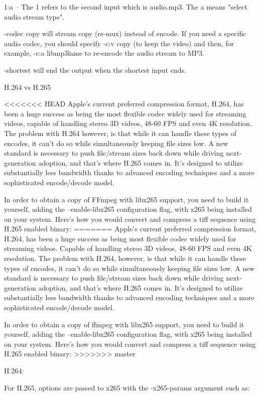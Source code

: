 \begin{fullwidth}
1:a – The 1 refers to the second input which is audio.mp3. The a means "select audio stream type".

-codec copy will stream copy (re-mux) instead of encode. If you need a specific audio codec, you should specify -c:v copy (to keep the video) and then, for example, -c:a libmp3lame to re-encode the audio stream to MP3.

-shortest will end the output when the shortest input ends.

{\large H.264 vs H.265 \par}

<<<<<<< HEAD
Apple’s current preferred compression format, H.264, has been a huge success as being the most flexible codec widely used for streaming videos, capable of handling stereo 3D videos, 48-60 FPS and even 4K resolution. The problem with H.264 however, is that while it can handle these types of encodes, it can’t do so while simultaneously keeping file sizes low. A new standard is necessary to push file/stream sizes back down while driving next-generation adoption, and that’s where H.265 comes in. It’s designed to utilize substantially less bandwidth thanks to advanced encoding techniques and a more sophisticated encode/decode model.

In order to obtain a copy of FFmpeg with libx265 support, you need to build it yourself, adding the --enable-libx265 configuration flag, with x265 being installed on your system. Here’s how you would convert and compress a tiff sequence using H.265 enabled binary:
=======
Apple’s current preferred compression format, H.264, has been a huge success as being most flexible codec widely used for streaming videos. Capable of handling stereo 3D videos, 48-60 FPS and even 4K resolution. The problem with H.264, however, is that while it can handle these types of encodes, it can’t do so while simultaneously keeping file sizes low. A new standard is necessary to push file/stream sizes back down while driving next-generation adoption, and that’s where H.265 comes in. It’s designed to utilize substantially less bandwidth thanks to advanced encoding techniques and a more sophisticated encode/decode model.

In order to obtain a copy of ffmpeg with libx265 support, you need to build it yourself, adding the --enable-libx265 configuration flag, with x265 being installed on your system. Here’s how you would convert and compress a tiff sequence using H.265 enabled binary:
>>>>>>> master

H.264:


For H.265, options are passed to x265 with the -x265-params argument such as:



\clearpage
\end{fullwidth}